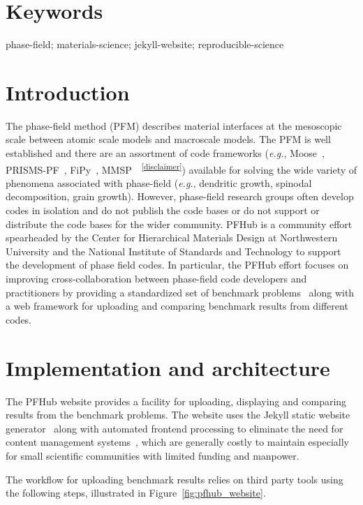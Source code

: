 \documentclass{jors}
\begin{document}
\section*{Keywords}

phase-field; materials-science; jekyll-website; reproducible-science

\section*{Introduction}

The phase-field method (PFM) describes material interfaces at the
mesoscopic scale between atomic scale models and macroscale models.
The PFM is well established and there are an assortment of code
frameworks (\emph{e.g.}, Moose~\cite{moose},
PRISMS-PF~\cite{prisms-pf}, FiPy~\cite{fipy},
MMSP~\cite{mmsp}~\textsuperscript{\ref{disclaimer}}) available for
solving the wide variety of phenomena associated with phase-field
(\emph{e.g.}, dendritic growth, spinodal decomposition, grain
growth). However, phase-field research groups often develop codes in
isolation and do not publish the code bases or do not support or
distribute the code bases for the wider community. PFHub is a
community effort spearheaded by the Center for Hierarchical Materials
Design at Northwestern University and the National Institute of
Standards and Technology to support the development of phase field
codes. In particular, the PFHub effort focuses on improving
cross-collaboration between phase-field code developers and
practitioners by providing a standardized set of benchmark
problems~\cite{bm1, bm2} along with a web framework for uploading and
comparing benchmark results from different codes.

\section*{Implementation and architecture}

The PFHub website provides a facility for uploading, displaying and
comparing results from the benchmark problems. The website uses the
Jekyll static website generator~\cite{jekyll} along with automated
frontend processing to eliminate the need for content management
systems~\cite{cmsfree}, which are generally costly to maintain
especially for small scientific communities with limited funding and
manpower.

The workflow for uploading benchmark results relies on third party
tools using the following steps, illustrated in
Figure~\ref{fig:pfhub_website}.
\end{document}
